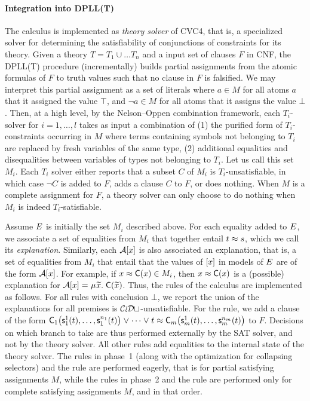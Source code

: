 \paragraph{Integration into DPLL(T)}
The calculus is implemented as \emph{theory solver} of CVC4,
that is, a specialized solver for determining the satisfiability of conjunctions of constraints for its theory.
Given a theory $T = T_1 \mathrel\cup \ldots T_n$ and a input set of clauses $F$ in CNF,
the DPLL(T)  procedure
(incrementally) builds partial assignments from the atomic formulas of $F$ to truth values such that no clause in $F$ is falsified.
We may interpret this partial assignment as a set of literals where $a \in M$ for all atoms $a$ that it assigned the value $\top$, and $\neg a \in M$ for all atoms that it assigns the value $\bot$.
Then, at a high level, by the Nelson--Oppen combination framework,
each $T_i$-solver for $i = 1, \ldots, l$ takes as input a combination of (1) the purified form of $T_i$-constraints occurring in $M$ where terms containing symbols not belonging to $T_i$ are replaced by fresh variables of the same type,
(2) additional equalities and disequalities between variables of types not belonging to $T_i$.
Let us call this set $M_i$.
Each $T_i$ solver either
reports that a subset $C$ of $M_i$ is $T_i$-unsatisfiable, in which case $\neg C$ is added to $F$,
adds a clause $C$ to $F$,
or does nothing.
When $M$ is a complete assignment for $F$, a theory solver can only choose to do nothing when $M_i$ is indeed $T_i$-satisfiable.

Assume $E$ is initially the set $M_i$ described above.
For each equality added to $E$, we associate a set of equalities from $M_i$ that together entail $t \approx s$,
which we call its \emph{explanation}.
Similarly, each $\mathcal{A} [x]$ is also associated an explanation, that is,
a set of equalities from $M_i$ that entail that the values of $[x]$ in models of $E$ are of the form $\mathcal{A} [x]$.
For example, if $x \approx \textsf{C}( x ) \in M_i$, then $x \approx \textsf{C}( x )$ is a (possible) explanation for $\Val \ec{x} = \MU {\Varec{x}}.\; \const{C}( {\Varec{x}} )$.
Thus, the rules of the calculus are implemented as follows.
For all rules with conclusion $\bot$,
we report the union of the explanations for all premises is $\mathcal{CoDt}$-unsatisfiable.
For the  rule, we add a clause of the form
$\textsf{C}_1\bigl( \textsf{s}^1_1( t ), \ldots, \textsf{s}^{n_1}_1( t ) \bigr) \mathrel\lor \cdots \mathrel\lor t \approx \textsf{C}_m\bigl( \textsf{s}^1_m( t ), \ldots, \textsf{s}^{n_m}_m( t ) \bigr)$
to $F$.
Decisions on which branch to take are thus performed externally by the SAT solver, and not by the theory solver.
All other rules add equalities to the internal state of the theory solver.
The rules in phase~1 (along with the optimization for collapsing selectors) and the  rule are performed eagerly,
that is for partial satisfying assignments $M$, while the rules in phase~2 and the  rule are performed only for complete satisfying assignments $M$,
and in that order.

